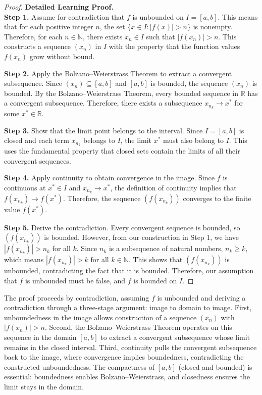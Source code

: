 \begin{proof}
\textbf{Detailed Learning Proof.}~\\

\textbf{Step 1.} Assume for contradiction that $f$ is unbounded on $I = [a,b]$. This means that for each positive integer $n$, the set $\{x \in I : |f(x)| > n\}$ is nonempty. Therefore, for each $n \in \mathbb{N}$, there exists $x_n \in I$ such that $|f(x_n)| > n$. This constructs a sequence $(x_n)$ in $I$ with the property that the function values $f(x_n)$ grow without bound.

\textbf{Step 2.} Apply the Bolzano--Weierstrass Theorem to extract a convergent subsequence. Since $(x_n) \subseteq [a,b]$ and $[a,b]$ is bounded, the sequence $(x_n)$ is bounded. By the Bolzano--Weierstrass Theorem, every bounded sequence in $\mathbb{R}$ has a convergent subsequence. Therefore, there exists a subsequence $x_{n_k} \to x^*$ for some $x^* \in \mathbb{R}$.

\textbf{Step 3.} Show that the limit point belongs to the interval. Since $I = [a,b]$ is closed and each term $x_{n_k}$ belongs to $I$, the limit $x^*$ must also belong to $I$. This uses the fundamental property that closed sets contain the limits of all their convergent sequences.

\textbf{Step 4.} Apply continuity to obtain convergence in the image. Since $f$ is continuous at $x^* \in I$ and $x_{n_k} \to x^*$, the definition of continuity implies that $f(x_{n_k}) \to f(x^*)$. Therefore, the sequence $(f(x_{n_k}))$ converges to the finite value $f(x^*)$.

\textbf{Step 5.} Derive the contradiction. Every convergent sequence is bounded, so $(f(x_{n_k}))$ is bounded. However, from our construction in Step 1, we have $|f(x_{n_k})| > n_k$ for all $k$. Since $n_k$ is a subsequence of natural numbers, $n_k \geq k$, which means $|f(x_{n_k})| > k$ for all $k \in \mathbb{N}$. This shows that $(f(x_{n_k}))$ is unbounded, contradicting the fact that it is bounded. Therefore, our assumption that $f$ is unbounded must be false, and $f$ is bounded on $I$.
\end{proof}

\begin{remark*}
The proof proceeds by contradiction, assuming $f$ is unbounded and deriving a contradiction through a three-stage argument: image to domain to image. First, unboundedness in the image allows construction of a sequence $(x_n)$ with $|f(x_n)| > n$. Second, the Bolzano--Weierstrass Theorem operates on this sequence in the domain $[a,b]$ to extract a convergent subsequence whose limit remains in the closed interval. Third, continuity pulls the convergent subsequence back to the image, where convergence implies boundedness, contradicting the constructed unboundedness. The compactness of $[a,b]$ (closed and bounded) is essential: boundedness enables Bolzano--Weierstrass, and closedness ensures the limit stays in the domain.
\end{remark*}

